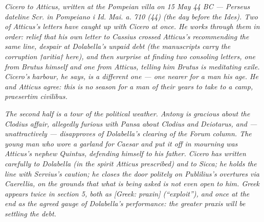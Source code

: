 
\textit{Cicero to Atticus, written at the Pompeian villa on 15 May
44 BC --- Perseus dateline \textit{Scr. in Pompeiano i Id. Mai. a.
710 (44)} (the day before the Ides). Two of Atticus's letters
have caught up with Cicero at once. He works through them in
order: relief that his own letter to Cassius crossed Atticus's
recommending the same line, despair at Dolabella's unpaid debt
(the manuscripts carry the corruption \textit{†aritia†} here),
and then surprise at finding two consoling letters, one from
Brutus himself and one from Atticus, telling him Brutus is
meditating exile. Cicero's harbour, he says, is a different
one --- one nearer for a man his age. He and Atticus agree:
this is no season for a man of their years to take to a camp,
\textit{praesertim civilibus}.}

\textit{The second half is a tour of the political weather.
Antony is gracious about the Clodius affair, allegedly furious
with Pansa about Clodius and Deiotarus, and --- unattractively
--- disapproves of Dolabella's clearing of the Forum column.
The young man who wore a garland for Caesar and put it off in
mourning was Atticus's nephew Quintus, defending himself to his
father. Cicero has written carefully to Dolabella (in the
spirit Atticus prescribed) and to Sicca; he holds the line with
Servius's caution; he closes the door politely on Publilius's
overtures via Caerellia, on the grounds that what is being
asked is not even open to him. Greek appears twice in section
5, both as \textit{[Greek: praxin]} (``exploit''), and once at
the end as the agreed gauge of Dolabella's performance: the
greater \textit{praxis} will be settling the debt.}
